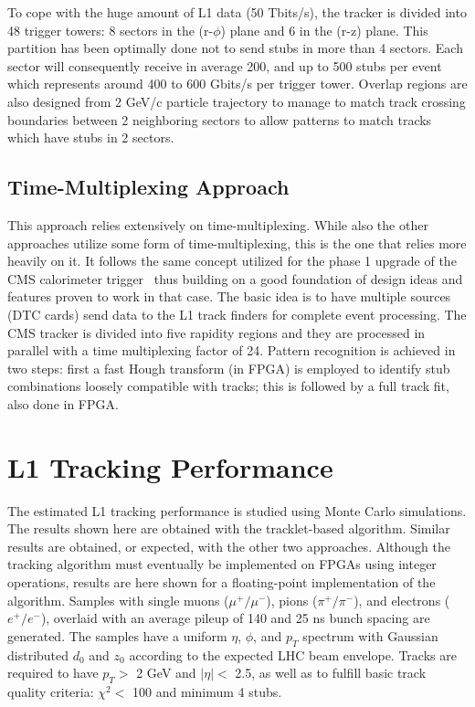 \documentclass{PoS}
\begin{document}
To cope with the huge amount of L1 data (50 Tbits/s), the tracker is divided into 48 trigger towers: 8 sectors in the (r-$\phi$) plane and 6 in the (r-z) plane. This partition has been optimally done not to send stubs in more than 4 sectors. Each sector will consequently receive in average 200, and up to 500 stubs per event which represents around 400 to 600 Gbits/s per trigger tower. Overlap regions are also designed from 2 GeV/c particle trajectory to manage to match track crossing boundaries between 2 neighboring sectors to allow patterns to match tracks which have stubs in 2 sectors.

\subsection{Time-Multiplexing Approach}

This approach relies extensively on time-multiplexing. While also the other approaches utilize some form of time-multiplexing, this is the one that relies more heavily on it. It follows the same concept utilized for the phase 1 upgrade of the CMS calorimeter trigger~\cite{Phase1CaloTriggerUpgrade} thus building on a good foundation of design ideas and features proven to work in that case. The basic idea is to have multiple sources (DTC cards) send data to the L1 track finders for complete event processing. The CMS tracker is divided into five rapidity regions and they are processed in parallel with a time multiplexing factor of 24. Pattern recognition is achieved in two steps: first a fast Hough transform (in FPGA) is employed to identify stub combinations loosely compatible with tracks; this is followed by a full track fit, also done in FPGA. 

\section{L1 Tracking Performance}

The estimated L1 tracking performance is studied using Monte Carlo simulations. The results shown here are obtained with the tracklet-based algorithm. Similar results are obtained, or expected, with the other two approaches. Although the tracking algorithm must eventually be implemented on FPGAs using integer operations, results are here shown for a floating-point implementation of the algorithm. Samples with single muons ($\mu^+/\mu^-$), pions ($\pi^+/\pi^−$), and electrons ($e^+/e^−$), overlaid with an average pileup of 140 and 25 ns bunch spacing are generated. The samples have a uniform $\eta$, $\phi$, and $p_T$ spectrum with Gaussian distributed $d_0$ and $z_0$ according to the expected LHC beam envelope. Tracks are required to have $p_T >$ 2 GeV and $|\eta| <$ 2.5, as well as to fulfill basic track quality criteria: $\chi^2 <$ 100 and minimum 4 stubs.
\end{document}
